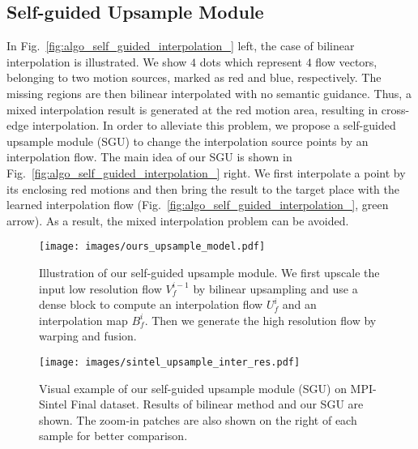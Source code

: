 \documentclass[final]{cvpr}
\begin{document}
\subsection{Self-guided Upsample Module}\label{sec:algo_self_guided_upsample}
In Fig.~\ref{fig:algo_self_guided_interpolation_} left, the case of bilinear interpolation is illustrated. We show $4$ dots which represent $4$ flow vectors, belonging to two motion sources, marked as red and blue, respectively. The missing regions are then bilinear interpolated with no semantic guidance. Thus, a mixed interpolation result is generated at the red motion area, resulting in cross-edge interpolation. In order to alleviate this problem, we propose a self-guided upsample module (SGU) to change the interpolation source points by an interpolation flow.
The main idea of our SGU is shown in Fig.~\ref{fig:algo_self_guided_interpolation_} right. We first interpolate a point by its enclosing red motions and then bring the result to the target place with the learned interpolation flow (Fig.~\ref{fig:algo_self_guided_interpolation_}, green arrow). As a result, the mixed interpolation problem can be avoided. 

\begin{figure}
	\centering
	\texttt{[image: images/ours\_upsample\_model.pdf]}
	\caption{Illustration of our self-guided upsample module. We first upscale the input low resolution flow $V_{f}^{i-1}$ by bilinear upsampling and use a dense block to compute an interpolation flow $U_{f}^{i}$ and an interpolation map $B_{f}^{i}$. Then we generate the high resolution flow by warping and fusion. 
	}\label{fig:algo_our_upsample_model}
\end{figure}

\begin{figure*}
	\centering
	\texttt{[image: images/sintel\_upsample\_inter\_res.pdf]}
	\caption{Visual example of our self-guided upsample module (SGU) on MPI-Sintel Final dataset. Results of bilinear method and our SGU are shown. The zoom-in patches are also shown on the right of each sample for better comparison. 
}\label{fig:upsample_inter_res_sintel}
\end{figure*}
\end{document}
